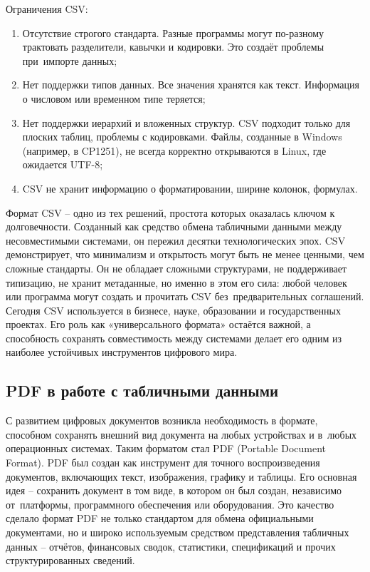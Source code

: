 \documentclass{ou}
\begin{document}
Ограничения CSV:
\begin{enumerate}[leftmargin=0em, itemindent=3.75em, nosep, label=\arabic*)]
\item Отсутствие строгого стандарта. Разные программы могут по-разному трактовать разделители, кавычки и кодировки. Это создаёт проблемы при~импорте данных;
\item Нет поддержки типов данных. Все значения хранятся как текст. Информация о числовом или временном типе теряется;
\item Нет поддержки иерархий и вложенных структур. CSV подходит только для плоских таблиц, проблемы с кодировками. Файлы, созданные в Windows (например, в CP1251), не всегда корректно открываются в Linux, где ожидается UTF-8;
\item CSV не хранит информацию о форматировании, ширине колонок, формулах.
\end{enumerate}

Формат CSV -- одно из тех решений, простота которых оказалась ключом к долговечности. Созданный как средство обмена табличными данными между несовместимыми системами, он пережил десятки технологических эпох. CSV демонстрирует, что минимализм и открытость могут быть не менее ценными, чем сложные стандарты. Он не обладает сложными структурами, не поддерживает типизацию, не хранит метаданные, но именно в этом его сила: любой человек или программа могут создать и прочитать CSV без~предварительных соглашений. Сегодня CSV используется в бизнесе, науке, образовании и государственных проектах. Его роль как «универсального формата» остаётся важной, а способность сохранять совместимость между системами делает его одним из наиболее устойчивых инструментов цифрового мира.
\subsection{PDF в работе с табличными данными}
С развитием цифровых документов возникла необходимость в формате, способном сохранять внешний вид документа на любых устройствах и в~любых операционных системах. Таким форматом стал PDF (Portable Document Format). PDF был создан как инструмент для точного воспроизведения документов, включающих текст, изображения, графику и таблицы. Его основная идея -- сохранить документ в том виде, в котором он был создан, независимо от~платформы, программного обеспечения или оборудования. Это качество сделало формат PDF не только стандартом для обмена официальными документами, но и широко используемым средством представления табличных данных -- отчётов, финансовых сводок, статистики, спецификаций и прочих структурированных сведений.
\end{document}
